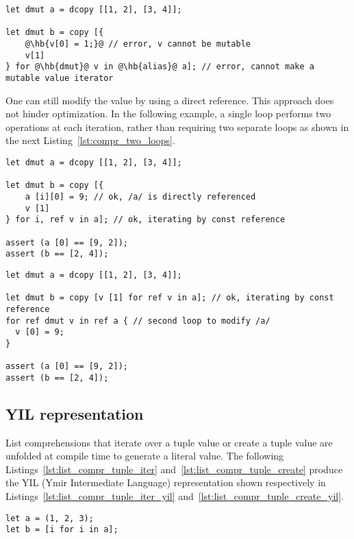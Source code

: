 \begin{lstlisting}[style=coloredverbatim, escapechar=@]
let dmut a = dcopy [[1, 2], [3, 4]];

let dmut b = copy [{
    @\hb{v[0] = 1;}@ // error, v cannot be mutable
    v[1]
} for @\hb{dmut}@ v in @\hb{alias}@ a]; // error, cannot make a mutable value iterator
\end{lstlisting}

One can still modify the value  by using a direct reference. This
approach does not hinder optimization. In the following example, a single loop
performs two operations at each iteration, rather than requiring two separate
loops as shown in the next Listing~\ref{lst:compr_two_loops}.

\begin{lstlisting}[style=coloredverbatim, caption=Modify existing value during list comprehension]
let dmut a = dcopy [[1, 2], [3, 4]];

let dmut b = copy [{
    a [i][0] = 9; // ok, /a/ is directly referenced
    v [1]
} for i, ref v in a]; // ok, iterating by const reference

assert (a [0] == [9, 2]);
assert (b == [2, 4]);
\end{lstlisting}

\begin{lstlisting}[style=coloredverbatim, caption=Using two loops]
let dmut a = dcopy [[1, 2], [3, 4]];

let dmut b = copy [v [1] for ref v in a]; // ok, iterating by const reference
for ref dmut v in ref a { // second loop to modify /a/
  v [0] = 9;
}

assert (a [0] == [9, 2]);
assert (b == [2, 4]);
\end{lstlisting}

\subsection {YIL representation}

List comprehensions that iterate over a tuple value or create a tuple value are
unfolded at compile time to generate a literal value. The following
Listings~\ref{lst:list_compr_tuple_iter} and~\ref{lst:list_compr_tuple_create}
produce the YIL (Ymir Intermediate Language) representation shown respectively
in Listings~\ref{lst:list_compr_tuple_iter_yil}
and~\ref{lst:list_compr_tuple_create_yil}.

\begin{lstlisting}[style=coloredverbatim, label=lst:list_compr_tuple_iter, caption=List comprehension iterating over a tuple]
let a = (1, 2, 3);
let b = [i for i in a];
\end{lstlisting}

